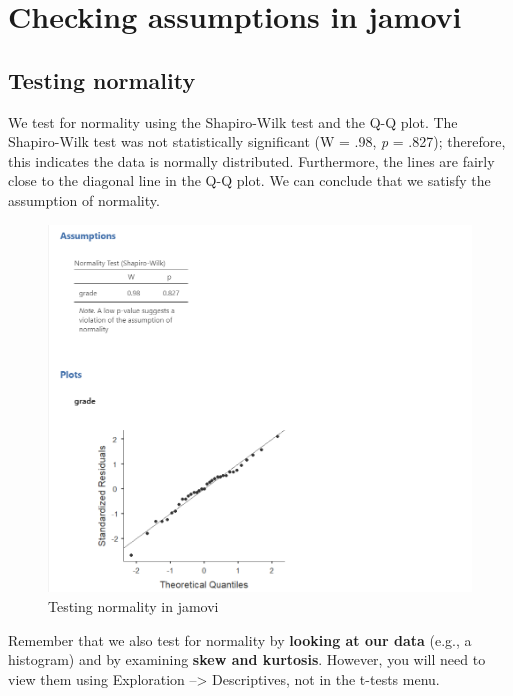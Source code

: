 \documentclass[
]{book}
\begin{document}
\hypertarget{checking-assumptions-in-jamovi}{%
\section{Checking assumptions in jamovi}\label{checking-assumptions-in-jamovi}}

\hypertarget{testing-normality}{%
\subsection{Testing normality}\label{testing-normality}}

We test for normality using the Shapiro-Wilk test and the Q-Q plot. The Shapiro-Wilk test was not statistically significant (W = .98, \emph{p} = .827); therefore, this indicates the data is normally distributed. Furthermore, the lines are fairly close to the diagonal line in the Q-Q plot. We can conclude that we satisfy the assumption of normality.

\begin{figure}

{\centering \includegraphics[width=1\linewidth]{images/02-independent_t-test/independent_t-test_normality} 

}

\caption{Testing normality in jamovi}\label{fig:unnamed-chunk-3}
\end{figure}

Remember that we also test for normality by \textbf{looking at our data} (e.g., a histogram) and by examining \textbf{skew and kurtosis}. However, you will need to view them using Exploration --\textgreater{} Descriptives, not in the t-tests menu.
\end{document}
